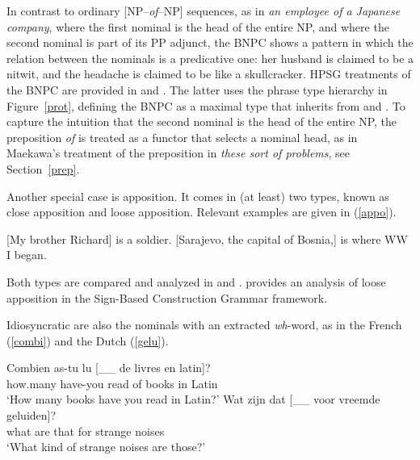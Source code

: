 \documentclass[output=paper
                ,modfonts
                ,nonflat
	        ,collection
	        ,collectionchapter
	        ,collectiontoclongg
 	        ,biblatex
                ,babelshorthands
                ,newtxmath
                ,draftmode
                ,colorlinks, citecolor=brown
]{./langsci/langscibook}
\begin{document}
\noindent
In contrast to ordinary [NP--\emph{of}--NP] sequences, 
as in \emph{an employee of a Japanese company}, where the 
first nominal is the head of the entire NP, and where the second 
nominal is part of its PP adjunct, the BNPC shows a pattern
in which the relation between the nominals is a predicative one: 
her husband is claimed to be a nitwit, and the headache is claimed to be 
like a skullcracker. HPSG treatments of the BNPC are provided in
\citet{KimSells14} and \citet{VanEynde18}. The latter uses 
the phrase type hierarchy in Figure~\ref{prot}, defining the BNPC as 
a maximal type that inherits from  and 
. To capture the intuition that the second
nominal is the head of the entire NP, the preposition \emph{of} is 
treated as a functor that selects a nominal head, as in Maekawa's treatment of 
the preposition in \emph{these sort of problems}, see Section~\ref{prep}. 

Another special case is apposition. It comes in (at least) two types, known as 
close apposition and loose apposition. Relevant examples are given in (\ref{appo}). 

\begin{exe} 
\ex\label{appo} 
\begin{xlist} 
\ex  {}[My brother Richard] is a soldier.  
\ex  {}[Sarajevo, the capital of Bosnia,] is where WW I began.
\end{xlist} 
\end{exe}

\noindent
Both types are compared and analyzed in \citet{Kim12} and \citet{Kim14}. 
\citet{VanEyndeKim16} provides an analysis of loose apposition in the 
Sign-Based Construction Grammar framework. 

Idiosyncratic are also the nominals with an extracted \emph{wh}-word, as in 
the French (\ref{combi}) and the Dutch (\ref{gelu}). 

\begin{exe} 
\ex\label{combi}  
\gll   Combien as-tu lu [\_\_ de livres en latin]?  \\
       how.many have-you read {} of books in Latin  \\ 
\trans `How many books have you read in Latin?' 
\ex\label{gelu}
\gll   Wat zijn dat [\_\_ voor vreemde geluiden]? \\
       what are that {} for strange noises        \\ 
\trans `What kind of strange noises are those?'  
\end{exe} 
\end{document}
